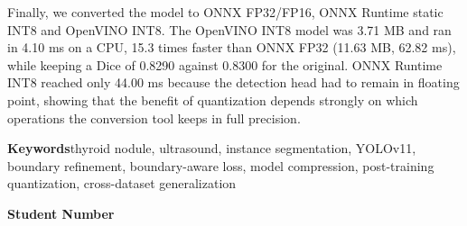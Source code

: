 Finally, we converted the model to ONNX FP32/FP16, ONNX Runtime static INT8 and OpenVINO INT8. The OpenVINO
INT8 model was 3.71 MB and ran in 4.10 ms on a CPU, 15.3 times faster than ONNX FP32 (11.63 MB, 62.82 ms),
while keeping a Dice of 0.8290 against 0.8300 for the original. ONNX Runtime INT8 reached only 44.00 ms
because the detection head had to remain in floating point, showing that the benefit of quantization
depends strongly on which operations the conversion tool keeps in full precision.

\vspace{6mm}
\noindent\textbf{Keywords}\quad thyroid nodule, ultrasound, instance segmentation, YOLOv11, boundary
refinement, boundary-aware loss, model compression, post-training quantization, cross-dataset generalization

\vspace{2mm}
\noindent\textbf{Student Number}\quad {}
